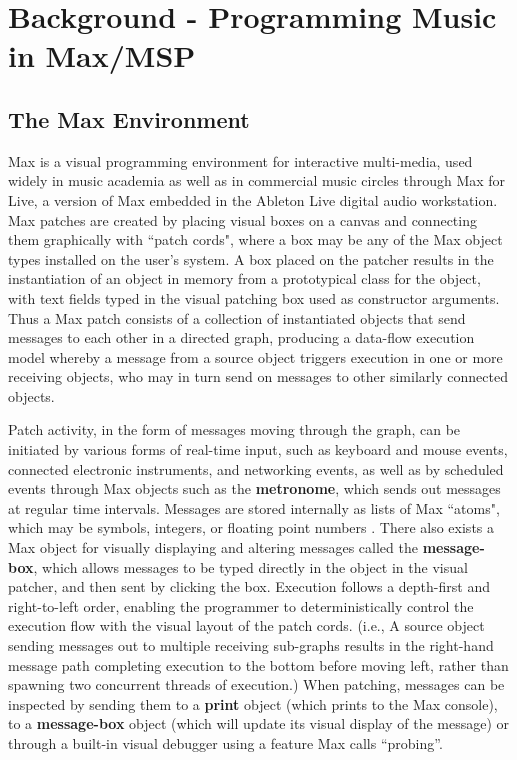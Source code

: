 \documentclass[acmsmall, anonymous, review]{acmart}
\begin{document}
\section{Background - Programming Music in Max/MSP}

\subsection{The Max Environment}

Max is a visual programming environment for interactive multi-media, 
used widely in music academia as well as in commercial music circles through Max for Live, 
a version of Max embedded in the Ableton Live digital audio workstation. 
Max patches are created by placing visual boxes on a canvas 
and connecting them graphically with ``patch cords", where a box may be
any of the Max object types installed on the user's system. A box placed on the patcher
results in the instantiation of an object in memory from a prototypical class for the object, with
text fields typed in the visual patching box used as constructor arguments. 
Thus a Max patch consists of a collection of instantiated objects that send messages to each other
in a directed graph, producing a data-flow execution model whereby a message from a source 
object triggers execution in one or more 
receiving objects, who may in turn send on messages to other similarly connected objects. 

Patch activity, in the form of messages moving through the graph, can be initiated by 
various forms of real-time input, such as keyboard and mouse events, connected electronic instruments, and networking 
events, as well as by scheduled events through Max objects such as the \textbf{metronome}, which sends
out messages at regular time intervals. Messages are 
stored internally as lists of Max ``atoms", which may be symbols, integers, or floating point numbers 
\cite{Puckette2002}.
There also exists a Max object for visually displaying and altering messages called the \textbf{message-box},
which allows messages to be typed directly in the object in the visual patcher, and then sent by clicking the box.  
Execution follows a depth-first and right-to-left order, enabling the programmer to deterministically 
control the execution flow with the visual layout of the patch cords. (i.e., A source object sending 
messages out to multiple receiving sub-graphs results in the right-hand message path completing 
execution to the bottom before moving left, rather than spawning two concurrent threads of execution.) When 
patching, messages can be inspected by sending them to a \textbf{print} object (which prints to the Max console),
to a \textbf{message-box} object (which will update its visual display of the message) 
or through a built-in visual debugger using a feature Max calls ``probing”.
\end{document}

